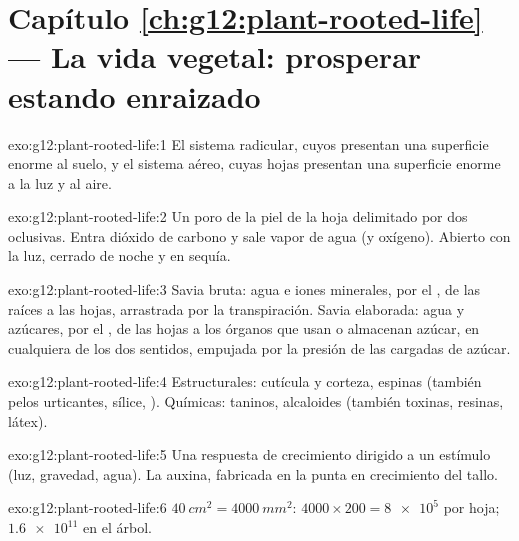 \section*{Capítulo \ref{ch:g12:plant-rooted-life} --- La vida vegetal: prosperar estando enraizado}

\begin{solution}{exo:g12:plant-rooted-life:1}
El sistema radicular, cuyos  presentan una superficie
enorme al suelo, y el sistema aéreo, cuyas hojas presentan una
superficie enorme a la luz y al aire.
\end{solution}

\begin{solution}{exo:g12:plant-rooted-life:2}
Un poro de la piel de la hoja delimitado por dos  oclusivas.
Entra dióxido de carbono y sale vapor de agua (y oxígeno). Abierto con
la luz, cerrado de noche y en sequía.
\end{solution}

\begin{solution}{exo:g12:plant-rooted-life:3}
Savia bruta: agua e iones minerales, por el , de las raíces a las
hojas, arrastrada por la transpiración. Savia elaborada: agua y
azúcares, por el , de las hojas a los órganos que usan o
almacenan azúcar, en cualquiera de los dos sentidos, empujada por la
presión de las  cargadas de azúcar.
\end{solution}

\begin{solution}{exo:g12:plant-rooted-life:4}
Estructurales: cutícula y corteza, espinas (también pelos urticantes,
sílice, ). Químicas: taninos, alcaloides (también
toxinas, resinas, látex).
\end{solution}

\begin{solution}{exo:g12:plant-rooted-life:5}
Una respuesta de crecimiento dirigido a un estímulo (luz, gravedad,
agua). La auxina, fabricada en la punta en crecimiento del tallo.
\end{solution}

\begin{solution}{exo:g12:plant-rooted-life:6}
$\qty{40}{cm^2} = \qty{4000}{mm^2}$: $4000 \times 200 = \num{8e5}$
 por hoja; $\num{1.6e11}$ en el árbol.
\end{solution}

